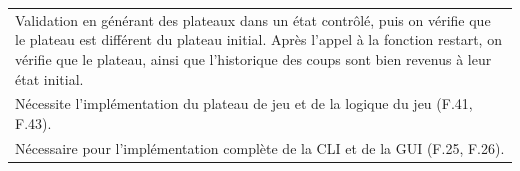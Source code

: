 \documentclass[a4paper,12pt]{article}
\begin{document}
\begin{tabularx}{\textwidth}{|X|}
    \arrayrulecolor{MediumAquamarine}\hline
    \arrayrulecolor{CornflowerBlue}
    Validation en générant des plateaux dans un état contrôlé, puis on vérifie que le plateau est différent du plateau initial. Après l’appel à la fonction restart, on vérifie que le plateau, ainsi que l’historique des coups sont bien revenus à leur état initial. \\
    \arrayrulecolor{MediumAquamarine}\hline
    \arrayrulecolor{CornflowerBlue}
    Nécessite l’implémentation du plateau de jeu et de la logique du jeu (F.41, F.43).                                                                                                                                                                                  \\
    Nécessaire pour l’implémentation complète de la CLI et de la GUI (F.25, F.26).                                                                                                                                                                                      \\
    \hline
\end{tabularx}

\vspace{1cm}
\end{document}
